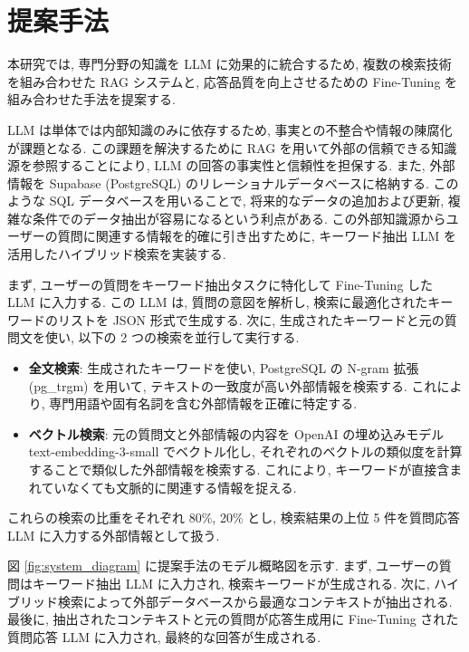 \documentclass{jarticle}
\begin{document}
\vspace{-3mm}
\section{提案手法}
\vspace{-1mm}

本研究では, 専門分野の知識を LLM に効果的に統合するため, 複数の検索技術を組み合わせた RAG システムと, 応答品質を向上させるための Fine-Tuning を組み合わせた手法を提案する. \par
LLM は単体では内部知識のみに依存するため, 事実との不整合や情報の陳腐化が課題となる. この課題を解決するために RAG を用いて外部の信頼できる知識源を参照することにより, LLM の回答の事実性と信頼性を担保する. また, 外部情報を Supabase (PostgreSQL) のリレーショナルデータベースに格納する. このような SQL データベースを用いることで, 将来的なデータの追加および更新, 複雑な条件でのデータ抽出が容易になるという利点がある. この外部知識源からユーザーの質問に関連する情報を的確に引き出すために, キーワード抽出 LLM を活用したハイブリッド検索を実装する. \par
まず, ユーザーの質問をキーワード抽出タスクに特化して Fine-Tuning した LLM に入力する. この LLM は, 質問の意図を解析し, 検索に最適化されたキーワードのリストを JSON 形式で生成する. 次に, 生成されたキーワードと元の質問文を使い, 以下の 2 つの検索を並行して実行する.

\begin{itemize}
\item \textbf{全文検索}: 生成されたキーワードを使い, PostgreSQL の N-gram 拡張 (pg\_trgm) を用いて, テキストの一致度が高い外部情報を検索する. これにより, 専門用語や固有名詞を含む外部情報を正確に特定する.
\item \textbf{ベクトル検索}: 元の質問文と外部情報の内容を OpenAI の埋め込みモデル text-embedding-3-small でベクトル化し, それぞれのベクトルの類似度を計算することで類似した外部情報を検索する. これにより, キーワードが直接含まれていなくても文脈的に関連する情報を捉える.
\end{itemize}

これらの検索の比重をそれぞれ 80\%, 20\% とし, 検索結果の上位 5 件を質問応答 LLM に入力する外部情報として扱う. \par
図 \ref{fig:system_diagram} に提案手法のモデル概略図を示す. まず, ユーザーの質問はキーワード抽出 LLM に入力され, 検索キーワードが生成される. 次に, ハイブリッド検索によって外部データベースから最適なコンテキストが抽出される. 最後に, 抽出されたコンテキストと元の質問が応答生成用に Fine-Tuning された質問応答 LLM に入力され, 最終的な回答が生成される.
\end{document}
